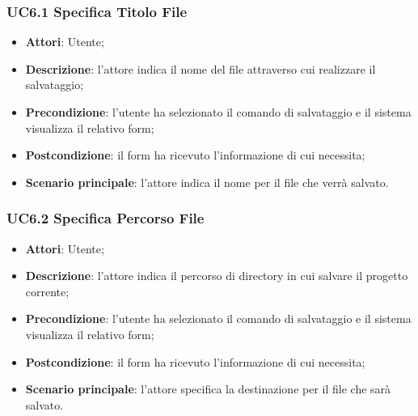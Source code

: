 \subsubsection{UC6.1 Specifica Titolo File}
\label{UC6.1}
\begin{itemize}
	\item \textbf{Attori}: Utente;
	\item \textbf{Descrizione}: l'attore indica il nome del file attraverso cui realizzare il salvataggio;
	\item \textbf{Precondizione}: l'utente ha selezionato il comando di salvataggio e il sistema visualizza il relativo form;
	\item \textbf{Postcondizione}: il form ha ricevuto l'informazione di cui necessita;
	\item \textbf{Scenario principale}: l'attore indica il nome per il file che verrà salvato.
\end{itemize}

\subsubsection{UC6.2 Specifica Percorso File}
\label{UC6.2}
\begin{itemize}
	\item \textbf{Attori}: Utente;
	\item \textbf{Descrizione}: l'attore indica il percorso di directory in cui salvare il progetto corrente;
	\item \textbf{Precondizione}: l'utente ha selezionato il comando di salvataggio e il sistema visualizza il relativo form;
	\item \textbf{Postcondizione}: il form ha ricevuto l'informazione di cui necessita;
	\item \textbf{Scenario principale}: l'attore specifica la destinazione per il file che sarà salvato.
\end{itemize}

